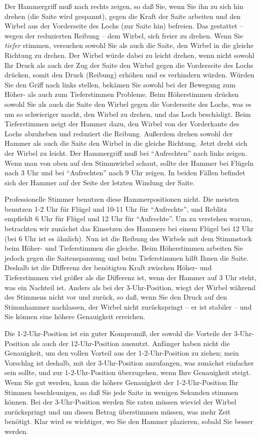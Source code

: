 Der Hammergriff muß nach rechts zeigen, so daß Sie, wenn Sie ihn zu sich hin drehen (die Saite wird gespannt), gegen die Kraft der Saite arbeiten und den Wirbel aus der Vorderseite des Lochs (zur Saite hin) befreien.
Das gestattet -- wegen der reduzierten Reibung -- dem Wirbel, sich freier zu drehen.
Wenn Sie \textit{tiefer} stimmen, versuchen sowohl Sie als auch die Saite, den Wirbel in die gleiche Richtung zu drehen.
Der Wirbel würde dabei zu leicht drehen, wenn nicht sowohl Ihr Druck als auch der Zug der Saite den Wirbel gegen die Vorderseite des Lochs drücken, somit den Druck (Reibung) erhöhen und es verhindern würden.
Würden Sie den Griff nach links stellen, bekämen Sie sowohl bei der Bewegung zum Höher- als auch zum Tieferstimmen Probleme.
Beim Höherstimmen drücken sowohl Sie als auch die Saite den Wirbel gegen die Vorderseite des Lochs, was es um so schwieriger macht, den Wirbel zu drehen, und das Loch beschädigt.
Beim Tieferstimmen neigt der Hammer dazu, den Wirbel von der Vorderkante des Lochs abzuheben und reduziert die Reibung.
Außerdem drehen sowohl der Hammer als auch die Saite den Wirbel in die gleiche Richtung.
Jetzt dreht sich der Wirbel zu leicht.
Der Hammergriff muß bei \enquote{Aufrechten} nach links zeigen.
Wenn man von oben auf den Stimmwirbel schaut, sollte der Hammer bei Flügeln nach 3 Uhr und bei \enquote{Aufrechten} nach 9 Uhr zeigen.
In beiden Fällen befindet sich der Hammer auf der Seite der letzten Windung der Saite.

Professionelle Stimmer benutzen diese Hammerpositionen nicht.
Die meisten benutzen 1-2 Uhr für Flügel und 10-11 Uhr für \enquote{Aufrechte}, und Reblitz empfiehlt 6 Uhr für Flügel und 12 Uhr für \enquote{Aufrechte}.
Um zu verstehen warum, betrachten wir zunächst das Einsetzen des Hammers bei einem Flügel bei 12 Uhr (bei 6 Uhr ist es ähnlich).
Nun ist die Reibung des Wirbels mit dem Stimmstock beim Höher- und Tieferstimmen die gleiche.
Beim Höherstimmen arbeiten Sie jedoch gegen die Saitenspannung und beim Tieferstimmen hilft Ihnen die Saite.
Deshalb ist die Differenz der benötigten Kraft zwischen Höher- und Tieferstimmen viel größer als die Differenz ist, wenn der Hammer auf 3 Uhr steht, was ein Nachteil ist.
Anders als bei der 3-Uhr-Position, wiegt der Wirbel während des Stimmens nicht vor und zurück, so daß, wenn Sie den Druck auf den Stimmhammer nachlassen, der Wirbel nicht zurückspringt -- er ist stabiler -- und Sie können eine höhere Genauigkeit erreichen.

Die 1-2-Uhr-Position ist ein guter Kompromiß, der sowohl die Vorteile der 3-Uhr-Position als auch der 12-Uhr-Position ausnutzt.
Anfänger haben nicht die Genauigkeit, um den vollen Vorteil aus der 1-2-Uhr-Position zu ziehen; mein Vorschlag ist deshalb, mit der 3-Uhr-Position anzufangen, was zunächst einfacher sein sollte, und zur 1-2-Uhr-Position überzugehen, wenn Ihre Genauigkeit steigt.
Wenn Sie gut werden, kann die höhere Genauigkeit der 1-2-Uhr-Position Ihr Stimmen beschleunigen, so daß Sie jede Saite in wenigen Sekunden stimmen können.
Bei der 3-Uhr-Position werden Sie raten müssen wieviel der Wirbel zurückspringt und um diesen Betrag überstimmen müssen, was mehr Zeit benötigt.
Klar wird es wichtiger, wo Sie den Hammer plazieren, sobald Sie besser werden.
 

